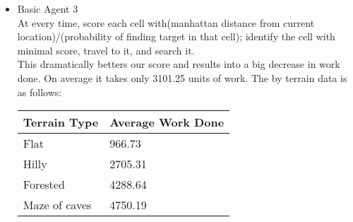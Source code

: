 \documentclass[12pt]{article} %
\begin{document}
\begin{itemize}
\begin{itemize}
\begin{table}[H]
\end{table}
\item Basic Agent 3\\
At every time, score each cell with(manhattan distance from current location)/(probability of finding target in that cell); identify the cell with minimal score, travel to it, and search it.\\
This dramatically betters our score and results into a big decrease in work done. On average it takes only 3101.25 units of work. The by terrain data is as follows:
\begin{table}[H]
\begin{tabular}{|l|l|}
\hline
Terrain Type  & Average Work Done \\ \hline
Flat          & 966.73            \\ \hline
Hilly         & 2705.31           \\ \hline
Forested      & 4288.64           \\ \hline
Maze of caves & 4750.19           \\ \hline
\end{tabular}
\end{table}

\end{itemize}

\end{itemize}
\end{document}
